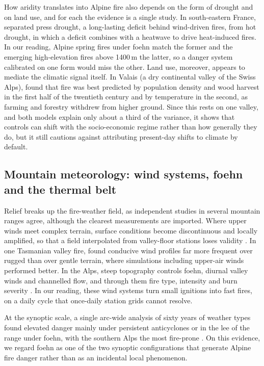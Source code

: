 \documentclass[11pt,a4paper]{article}
\begin{document}
How aridity translates into Alpine fire also depends on the form of drought and on land use, and for each the evidence is a single study. In south-eastern France, \citet{ruffault_extreme_2018} separated press drought, a long-lasting deficit behind wind-driven fires, from hot drought, in which a deficit combines with a heatwave to drive heat-induced fires. In our reading, Alpine spring fires under foehn match the former and the emerging high-elevation fires above 1400\,m \citep{beloiu_climatedriven_2026} the latter, so a danger system calibrated on one form would miss the other. Land use, moreover, appears to mediate the climatic signal itself. In Valais (a dry continental valley of the Swiss Alps), \citet{zumbrunnen_human_2012} found that fire was best predicted by population density and wood harvest in the first half of the twentieth century and by temperature in the second, as farming and forestry withdrew from higher ground. Since this rests on one valley, and both models explain only about a third of the variance, it shows that controls can shift with the socio-economic regime rather than how generally they do, but it still cautions against attributing present-day shifts to climate by default.

\subsection{Mountain meteorology: wind systems, foehn and the thermal belt}

Relief breaks up the fire-weather field, as independent studies in several mountain ranges agree, although the clearest measurements are imported. Where upper winds meet complex terrain, surface conditions become discontinuous and locally amplified, so that a field interpolated from valley-floor stations loses validity \citep{sharples_overview_2009}. In one Tasmanian valley fire, \citet{ozaki_impact_2022} found conducive wind profiles far more frequent over rugged than over gentle terrain, where simulations including upper-air winds performed better. In the Alps, steep topography controls foehn, diurnal valley winds and channelled flow, and through them fire type, intensity and burn severity \citep{melzner_wildfire-induced_2025}. In our reading, these wind systems turn small ignitions into fast fires, on a daily cycle that once-daily station grids cannot resolve.

At the synoptic scale, a single arc-wide analysis of sixty years of weather types found elevated danger mainly under persistent anticyclones or in the lee of the range under foehn, with the southern Alps the most fire-prone \citep{wastl_largescale_2013}. On this evidence, we regard foehn as one of the two synoptic configurations that generate Alpine fire danger rather than as an incidental local phenomenon.
\end{document}
